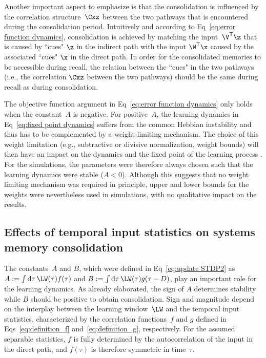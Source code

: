 Another important aspect to emphasize is that the consolidation is influenced by the correlation structure~$\Cxz$ between the two pathways that is encountered during the consolidation period. Intuitively and according to Eq~\eqref{eq:error function dynamics}, consolidation is achieved by matching the input~$\V^\mathsf{T} \z$ that is caused by ``cues" $\z$ in the indirect path with the input $\W^\mathsf{T} \x$ caused by the associated ``cues" $\x$ in the direct path. In order for the consolidated memories to be accessible during recall, the relation between the ``cues" in the two pathways (i.e., the correlation $\Cxz$ between the two pathways) should be the same during recall as during consolidation.

The objective function argument in Eq~\eqref{eq:error function dynamics} only holds when the constant~$A$ is negative. For positive~$A$, the learning dynamics in Eq~\eqref{eq:fixed point dynamics} suffers from the common Hebbian instability and thus has to be complemented by a weight-limiting mechanism. The choice of this weight limitation (e.g., subtractive or divisive normalization, weight bounds) will then have an impact on the dynamics and the fixed point of the learning process \cite{Miller1994, Dayan2001}. For the simulations, the parameters were therefore always chosen such that the learning dynamics were stable ($A<0$). Although this suggests that no weight limiting mechanism was required in principle, upper and lower bounds for the weights were nevertheless used in simulations, with no qualitative impact on the results.


\subsection{Effects of temporal input statistics on systems memory consolidation}
\label{ssec:theory_timing}

The constants~$A$ and $B$, which were defined in Eq~\eqref{eq:update STDP2} as
$A := \int \mathrm {d} \tau\, \LW(\tau) f(\tau)$ and
$B := \int \mathrm {d} \tau\, \LW(\tau) g(\tau-D)$, play an important role for the learning dynamics.
As already elaborated, the sign of $A$ determines stability  while $B$ should be positive to obtain consolidation.
Sign and magnitude depend on the interplay between the learning window~$\LW$ and the temporal input statistics, characterized by the correlation functions~$f$ and $g$
defined in Eqs~\eqref{eq:definition_f} and~\eqref{eq:definition_g}, respectively. For the assumed separable statistics, $f$ is fully determined by the autocorrelation of the input in the direct path, and $f(\tau)$ is therefore symmetric in time~$\tau$.

